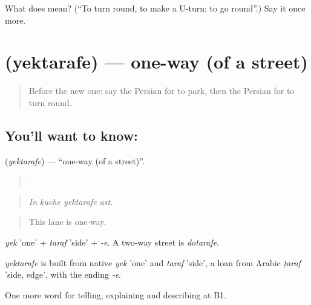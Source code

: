 \begin{tcolorbox}[breakable,colback=teal!4,colframe=teal!35!black,title={Before you move on}]
What does   mean? (\textquotedblleft{}To turn round, to make a U-turn; to go round\textquotedblright{}.) Say it once more.
\end{tcolorbox}
\section[\texorpdfstring{\fa{یک} \fa{طرفه} (yektarafe)}{یک طرفه (yektarafe)}]{  (yektarafe) — one-way (of a street)}

\label{lesson:FA-C426-yektarafe}



\begin{quote}
Before the new one: say the Persian for to park, then the Persian for to turn round.
\end{quote}

\subsection*{You'll want to know:  }
\textbf{ } (\emph{yektarafe}) — \textquotedblleft{}one-way (of a street)\textquotedblright{}.

\begin{quote}
    .
\end{quote}

\begin{quote}
\emph{In kuche yektarafe ast.}
\end{quote}

\begin{quote}
This lane is one-way.
\end{quote}

\emph{yek} 'one' + \emph{taraf} 'side' + \emph{-e}. A two-way street is \emph{dotarafe}.

\begin{cousinweb}
\emph{yektarafe} is built from native \emph{yek} 'one' and \emph{taraf} 'side', a loan from Arabic \emph{ṭaraf} 'side, edge', with the ending \emph{-e}.
\end{cousinweb}

\begin{grammarlens}[title={What you've built}]
One more word for telling, explaining and describing at B1.
\end{grammarlens}

